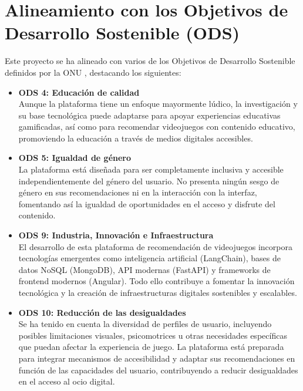 \section{Alineamiento con los Objetivos de Desarrollo Sostenible (ODS)}

Este proyecto se ha alineado con varios de los Objetivos de Desarrollo Sostenible definidos por la ONU \cite{ONU_ODS_Web}, destacando los siguientes:

\begin{itemize}

	
	\item \textbf{ODS 4: Educación de calidad} \\
	Aunque la plataforma tiene un enfoque mayormente lúdico, la investigación y su base tecnológica puede adaptarse para apoyar experiencias educativas gamificadas, así como para recomendar videojuegos con contenido educativo, promoviendo la educación a través de medios digitales accesibles.
	
	\item \textbf{ODS 5: Igualdad de género} \\
	La plataforma está diseñada para ser completamente inclusiva y accesible independientemente del género del usuario. No presenta ningún sesgo de género en sus recomendaciones ni en la interacción con la interfaz, fomentando así la igualdad de oportunidades en el acceso y disfrute del contenido.
	
		\item \textbf{ODS 9: Industria, Innovación e Infraestructura} \\
	El desarrollo de esta plataforma de recomendación de videojuegos incorpora tecnologías emergentes como inteligencia artificial (LangChain), bases de datos NoSQL (MongoDB), API modernas (FastAPI) y frameworks de frontend modernos (Angular). Todo ello contribuye a fomentar la innovación tecnológica y la creación de infraestructuras digitales sostenibles y escalables.
	
	\item \textbf{ODS 10: Reducción de las desigualdades} \\
	Se ha tenido en cuenta la diversidad de perfiles de usuario, incluyendo posibles limitaciones visuales, psicomotrices u otras necesidades específicas que puedan afectar la experiencia de juego. La plataforma está preparada para integrar mecanismos de accesibilidad y adaptar sus recomendaciones en función de las capacidades del usuario, contribuyendo a reducir desigualdades en el acceso al ocio digital.
\end{itemize}


